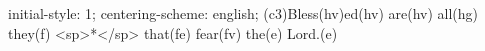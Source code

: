 initial-style: 1;
centering-scheme: english;
(c3)Bless(hv)ed(hv) are(hv) all(hg) they(f) <sp>*</sp> that(fe) fear(fv) the(e) Lord.(e)
